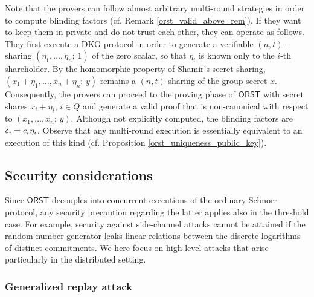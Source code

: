 \documentclass{iacrtrans}
\begin{document}
Note that the provers can follow almost arbitrary
multi-round strategies
in order to compute blinding factors
(cf. Remark \ref{orst_valid_above_rem}).
If they want to keep them
in private and do not trust each other,
they can operate as follows.
They first execute a DKG protocol
in order to generate a verifiable $(n, t)$-sharing
$(\eta_1, \dots, \eta_n;\hspace{2pt} 1)$
of the zero scalar, so that $\eta_i$
is known only to the $i$-th shareholder.
By the homomorphic property of Shamir's secret sharing,
$(x_1 + \eta_1, \dots, x_n + \eta_n;\hspace{2pt} y)$
remains a $(n, t)$-sharing of the group secret $x$.
Consequently,
the provers can proceed to the proving phase of $\mathsf{ORST}$
with secret shares $x_i + \eta_i,\hspace{2pt} i \in Q$
and generate a valid proof that is
non-canonical with respect to $(x_1, \dots, x_n;\hspace{2pt} y)$.
Although not explicitly computed,
the blinding factors are
$\delta_i = c_i\hspace{0.5pt}\eta_i$.
Observe that
any multi-round execution is essentially equivalent
to an execution of this kind
(cf. Proposition \ref{orst_uniqueness_public_key}).

\subsection{Security considerations}

Since $\mathsf{ORST}$
decouples into concurrent executions
of the ordinary Schnorr protocol, any security precaution
regarding the latter applies also in the threshold case.
For example, security against side-channel attacks
cannot be attained if the random number generator
leaks linear relations between the discrete logarithms
of distinct commitments.
We here focus on high-level attacks that
arise particularly in the distributed setting.

\subsubsection{Generalized replay attack}\label{section_generalized_replay_attack}
\end{document}
